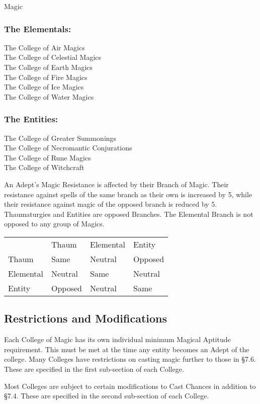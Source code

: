 \begin{Chapter}{Magic}
\subsubsection{The Elementals:}
The College of Air Magics \\
The College of Celestial Magics \\
The College of Earth Magics \\ 
The College of Fire Magics \\
The College of Ice Magics \\
The College of Water Magics 

\subsubsection{The Entities:}
The College of Greater Summonings \\
The College of Necromantic Conjurations \\
The College of Rune Magics \\
The College of Witchcraft

An Adept’s Magic Resistance is affected by their Branch of
Magic. Their resistance against spells of the same branch as their own
is increased by 5, while their resistance against magic of the opposed
branch is reduced by 5. Thaumaturgies and Entities are opposed
Branches.  The Elemental Branch is not opposed to any group of Magics.

\begin{tabularx}{\columnwidth}{XXXX}
		& Thaum		& Elemental	& Entity \\
Thaum		& Same		& Neutral	& Opposed \\ 
Elemental	& Neutral	& Same		& Neutral \\
Entity		& Opposed	& Neutral	& Same \\
\end{tabularx}

\subsection{Restrictions and Modifications}

Each College of Magic has its own individual minimum Magical Aptitude
requirement.  This must be met at the time any entity becomes an Adept
of the college.  Many Colleges have restrictions on casting magic
further to those in §7.6.  These are specified in the first
sub-section of each College.

Most Colleges are subject to certain modifications to Cast Chances in
addition to §7.4.  These are specified in the second sub-section of
each College.


\end{Chapter}

